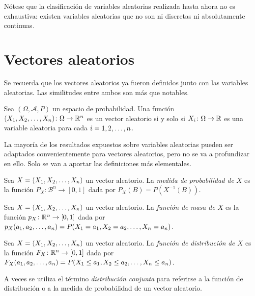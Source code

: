 \documentclass[a4paper, 11pt, extrafontsizes]{memoir}
\begin{document}
Nótese que la clasificación de variables aleatorias realizada hasta ahora no es exhaustiva: existen variables aleatorias que no son ni discretas ni absolutamente continuas.

\section{Vectores aleatorios}

Se recuerda que los vectores aleatorios ya fueron definidos junto con las variables aleatorias. Las similitudes entre ambos son más que notables.

\begin{proposition}
    Sea $(\Omega,\mathcal{A},P)$ un espacio de probabilidad. Una función $(X_1,X_2,\mathellipsis,X_n) \colon \Omega \to \mathbb R^n$ es un vector aleatorio si y solo si $X_i \colon \Omega \to \mathbb R$ es una variable aleatoria para cada $i = 1,2,\mathellipsis,n$.
\end{proposition}

La mayoría de los resultados expuestos sobre variables aleatorias pueden ser adaptados convenientemente para vectores aleatorios, pero no se va a profundizar en ello. Solo se van a aportar las definiciones más elementales.

\begin{definition}
    Sea $X = (X_1,X_2,\mathellipsis,X_n)$ un vector aleatorio. La \emph{medida de probabilidad de $X$} es la función $P_X \colon \mathcal{B}^n \to [0,1]$ dada por $P_X(B) = P(X^{-1}(B))$.
\end{definition}

\begin{definition}
    Sea $X = (X_1,X_2,\mathellipsis,X_n)$ un vector aleatorio. La \emph{función de masa de $X$} es la función $p_X \colon \mathbb R^n \to [0,1]$ dada por $p_X(a_1,a_2,\mathellipsis,a_n) = P(X_1 = a_1,X_2 = a_2, \mathellipsis, X_n = a_n)$.
\end{definition}

\begin{definition}
    Sea $X = (X_1,X_2,\mathellipsis,X_n)$ un vector aleatorio. La \emph{función de distribución de $X$} es la función $F_X \colon \mathbb R^n \to [0,1]$ dada por $F_X(a_1,a_2,\mathellipsis,a_n) = P(X_1 \leq a_1,X_2 \leq a_2, \mathellipsis, X_n \leq a_n)$.
\end{definition}

A veces se utiliza el término \emph{distribución conjunta} para referirse a la función de distribución o a la medida de probabilidad de un vector aleatorio.
\end{document}
